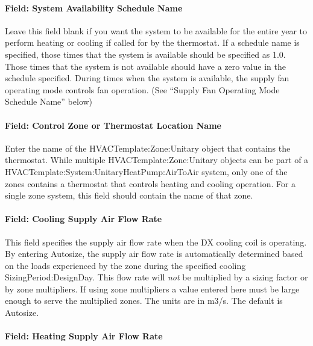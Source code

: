 \paragraph{Field: System Availability Schedule Name}\label{field-system-availability-schedule-name-8}

Leave this field blank if you want the system to be available for the entire year to perform heating or cooling if called for by the thermostat. If a schedule name is specified, those times that the system is available should be specified as 1.0. Those times that the system is not available should have a zero value in the schedule specified. During times when the system is available, the supply fan operating mode controls fan operation. (See ``Supply Fan Operating Mode Schedule Name'' below)

\paragraph{Field: Control Zone or Thermostat Location Name}\label{field-control-zone-or-thermostat-location-name-1}

Enter the name of the HVACTemplate:Zone:Unitary object that contains the thermostat. While multiple HVACTemplate:Zone:Unitary objects can be part of a HVACTemplate:System:UnitaryHeatPump:AirToAir system, only one of the zones contains a thermostat that controls heating and cooling operation. For a single zone system, this field should contain the name of that zone.

\paragraph{Field: Cooling Supply Air Flow Rate}\label{field-cooling-supply-air-flow-rate-4}

This field specifies the supply air flow rate when the DX cooling coil is operating. By entering Autosize, the supply air flow rate is automatically determined based on the loads experienced by the zone during the specified cooling SizingPeriod:DesignDay. This flow rate will \emph{not} be multiplied by a sizing factor or by zone multipliers. If using zone multipliers a value entered here must be large enough to serve the multiplied zones. The units are in m3/s. The default is Autosize.

\paragraph{Field: Heating Supply Air Flow Rate}\label{field-heating-supply-air-flow-rate-4}


